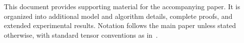 This document provides supporting material for the accompanying paper. It is
organized into additional model and algorithm details, complete proofs, and
extended experimental results. Notation follows the main paper unless stated
otherwise, with standard tensor conventions as in~\cite{Kolda2009Tensor}.
